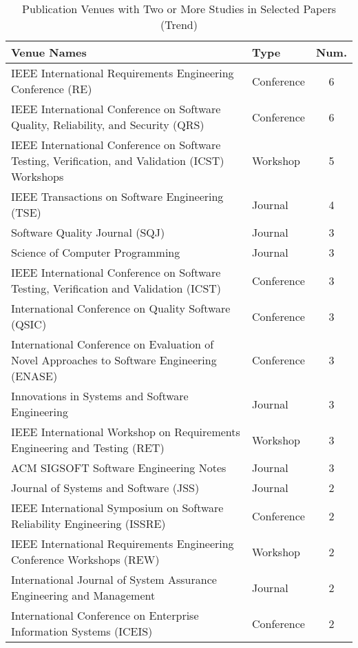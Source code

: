 \begin{table}[]
\small
\caption{Publication Venues with Two or More Studies in Selected Papers (Trend)}
\label{table:venue}
\begin{tabularx}{\textwidth}{Xlc}
\hline
\textbf{Venue Names} & \textbf{Type} & \textbf{Num.} \\ \hline
IEEE International Requirements Engineering Conference (RE) & Conference & \cellcolor{gray!70}6 \\
IEEE International Conference on Software Quality, Reliability, and Security (QRS) & Conference & \cellcolor{gray!70}6 \\
IEEE International Conference on Software Testing, Verification, and Validation (ICST) Workshops & Workshop & \cellcolor{gray!60}5 \\
IEEE Transactions on Software Engineering (TSE) & Journal & \cellcolor{gray!50}4 \\
Software Quality Journal (SQJ) & Journal & \cellcolor{gray!40}3 \\
Science of Computer Programming & Journal & \cellcolor{gray!40}3 \\
IEEE International Conference on Software Testing, Verification and Validation (ICST) & Conference & \cellcolor{gray!40}3 \\
International Conference on Quality Software (QSIC) & Conference & \cellcolor{gray!40}3 \\
International Conference on Evaluation of Novel Approaches to Software Engineering (ENASE) & Conference & \cellcolor{gray!40}3 \\
Innovations in Systems and Software Engineering & Journal & \cellcolor{gray!40}3 \\
IEEE International Workshop on Requirements Engineering and Testing (RET) & Workshop & \cellcolor{gray!40}3 \\
ACM SIGSOFT Software Engineering Notes & Journal & \cellcolor{gray!40}3 \\
Journal of Systems and Software (JSS) & Journal & \cellcolor{gray!30}2 \\
IEEE International Symposium on Software Reliability Engineering (ISSRE) & Conference & \cellcolor{gray!30}2 \\
IEEE International Requirements Engineering Conference Workshops (REW) & Workshop & \cellcolor{gray!30}2 \\
International Journal of System Assurance Engineering and Management & Journal & \cellcolor{gray!30}2 \\
International Conference on Enterprise Information Systems (ICEIS) & Conference & \cellcolor{gray!30}2 \\

\end{tabularx}
\end{table}
